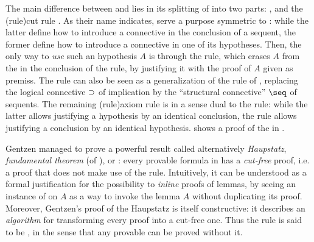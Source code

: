 \AP
The main difference between  and 
lies in its splitting of  into two parts: , and the \intro(rule){cut} rule . As their name
indicates,  serve a purpose symmetric to : while the latter define how to introduce a connective in
the conclusion of a sequent, the former define how to introduce a connective in
one of its hypotheses. Then, the only way to \emph{use} such an hypothesis $A$
is through the  rule, which erases $A$ from the  in the
conclusion of the rule, by justifying it with the proof of $A$ given as premiss.
The  rule can also be seen as a generalization of the 
rule of , replacing the logical connective $\supset$ of
implication by the ``structural connective'' $\seq$ of sequents. The remaining
\intro(rule){axiom} rule  is in a sense dual to the  rule:
while the latter allows justifying a hypothesis by an identical conclusion, the
 rule allows justifying a conclusion by an identical
hypothesis.  shows
a proof of the  in .

Gentzen managed to prove a powerful result called alternatively
\textit{Haupstatz}, \emph{fundamental theorem} (of ), or
: every provable formula in  has a
\emph{cut-free} proof, i.e. a proof that does not make use of the  rule.
Intuitively, it can be understood as a formal justification for the possibility
to \emph{inline} proofs of lemmas, by seeing an instance of  on $A$ as a
way to invoke the lemma $A$ without duplicating its proof. Moreover, Gentzen's
proof of the Haupstatz is itself constructive: it describes an \emph{algorithm}
for transforming every  proof into a cut-free one. Thus the
 rule is said to be , in the sense that any provable
 can be proved without it.


